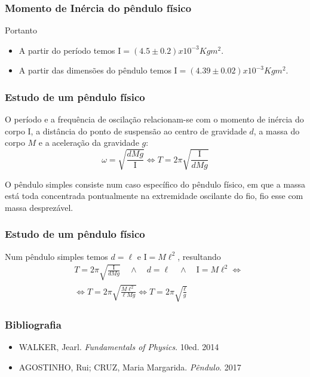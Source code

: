 \documentclass{beamer}
\begin{document}
\begin{frame}
	\frametitle{Momento de Inércia do pêndulo físico}
	Portanto
	\begin{itemize}
	 \item A partir do período temos $ \mathrm{I}=(4.5\pm0.2)x10^{-3}Kgm^2$.
	 \item A partir das dimensões do pêndulo temos $\mathrm{I}=(4.39\pm0.02)x10^{-3}Kgm^2$.
	\end{itemize}
\end{frame}

\begin{frame}
	\frametitle{Estudo de um pêndulo físico}
	O período e a frequência de oscilação relacionam-se com o momento de inércia do corpo $\mathrm{I}$, a distância do ponto de suspensão ao centro de gravidade $d$, a massa do corpo $M$ e a aceleração da gravidade $g$:
	$$\omega=\sqrt{\frac{dMg}{\mathrm{I}}} \iff T=2\pi\sqrt{\frac{\mathrm{I}}{dMg}}
	$$
		\begin{flushleft}
			\raggedright{O pêndulo simples consiste num caso específico do pêndulo físico, em que a massa está toda concentrada pontualmente na extremidade oscilante do fio, fio esse com massa desprezável.}
	\end{flushleft}
\end{frame}

\begin{frame}
	\frametitle{Estudo de um pêndulo físico}
	Num pêndulo simples temos $d=\ell$ e $\mathrm{I}=M\ell^2$, resultando
	\begin{equation}
	\begin{split}
		&T=2\pi\sqrt{\frac{\mathrm{I}}{dMg}} \quad\wedge \quad d=\ell \quad\wedge\quad \mathrm{I}=M\ell^2 \iff\\
		&\iff T=2\pi\sqrt{\frac{M\ell^2}{\ell Mg}} \iff T=2\pi\sqrt{\frac{\ell}{g}} \nonumber
	\end{split}
	\end{equation}	 
\end{frame}

\begin{frame}
	\frametitle{Bibliografia}
		\begin{itemize}
		\item WALKER, Jearl. \textit{Fundamentals of Physics}. 10ed. 2014
		\item AGOSTINHO, Rui; CRUZ, Maria Margarida. \textit{Pêndulo}. 2017
		\end{itemize}
\end{frame}
\end{document}
